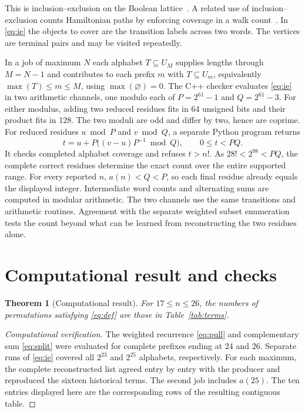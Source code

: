 \documentclass[11pt]{article}
\newtheorem{theorem}{Theorem}[section]
\begin{document}
This is inclusion--exclusion on the Boolean lattice~\cite{rota}.
A related use of inclusion--exclusion counts Hamiltonian paths by
enforcing coverage in a walk count~\cite{karpie,bax}. In \eqref{eq:ie}
the objects to cover are the transition labels across two words. The
vertices are terminal pairs and may be visited repeatedly.

In a
job of maximum \(N\) each alphabet \(T\subseteq U_M\) supplies lengths
through \(M=N-1\) and contributes to each prefix \(m\) with
\(T\subseteq U_m\), equivalently \(\max(T)\le m\le M\), using
\(\max(\varnothing)=0\).
The C++ checker evaluates \eqref{eq:ie} in two arithmetic channels, one modulo each of
\(P=2^{61}-1\) and \(Q=2^{61}-3\). For either modulus, adding two
reduced residues fits in 64 unsigned bits and their product fits in
128. The two moduli are odd and differ by two, hence are coprime.
For reduced residues \(u\bmod P\) and \(v\bmod Q\), a separate Python
program returns
\[
 t=u+P\bigl((v-u)P^{-1}\bmod Q\bigr),\qquad 0\le t<PQ.
\]
It checks completed alphabet coverage and refuses \(t>n!\).
As \(28!<2^{98}<PQ\), the complete correct residues determine the exact
count over the entire supported range. For every reported \(n\), \(a(n)<Q<P\), so each final
residue already equals the displayed integer. Intermediate word counts
and alternating sums are computed in modular arithmetic. The two channels
use the same transitions and arithmetic routines. Agreement with the
separate weighted subset enumeration tests the count beyond what can
be learned from reconstructing the two residues alone.

\section{Computational result and checks}\label{sec:results}

\begin{theorem}[Computational result]\label{thm:result}
For \(17\le n\le26\), the numbers of permutations satisfying
\eqref{eq:def} are those in Table~\ref{tab:terms}.
\end{theorem}
\begin{proof}[Computational verification]
The weighted recurrence \eqref{eq:pull} and complementary sum \eqref{eq:split}
were evaluated for complete prefixes ending at 24 and 26. Separate runs
of \eqref{eq:ie} covered all \(2^{23}\) and \(2^{25}\) alphabets,
respectively. For each maximum, the complete reconstructed list agreed
entry by entry with the producer and reproduced the sixteen historical terms.
The second job includes \(a(25)\). The ten entries displayed here are the
corresponding rows of the resulting contiguous table.
\end{proof}
\end{document}

